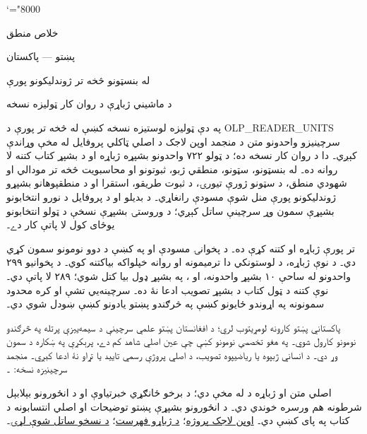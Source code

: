 \documentclass[11pt,a4paper,oneside]{report}
\theoremstyle{definition}
\begin{document}
\setRTL
\mathcode`\!="8000
\begin{titlepage}
\thispagestyle{empty}
\begin{center}
\vspace*{22mm}
{\Huge خلاص منطق}\par\bigskip
{\Large پښتو — پاکستان}\par\bigskip
{\LARGE له بنسټونو څخه تر ژوندليکونو پورې}\par\bigskip
د ماشيني ژباړې د روان کار ټوليزه نسخه
\end{center}
\bigskip
په دې ټوليزه لوستيزه نسخه کښې له  څخه تر
 پورې د OLP_READER_UNITS سرچينيزو واحدونو متن د
منجمد اوپن لاجک د اصلي ټاکلي پروفايل له مخې وړاندې کېږي۔ دا د روان کار
نسخه ده؛ د ټولو ۷۲۲ واحدونو بشپړه ژباړه او د بشپړ کتاب کتنه لا روانه ده۔
له بنسټونو، سټونو، منطقي ژبو، ثبوتونو او محاسبويت څخه تر مودالي او
شهودي منطق، د سټونو ژورې تيورۍ، د ثبوت طريقو، استقرا او د منطقپوهانو
بشپړو ژوندليکونو پورې منل شوې مسودې رانغاړي۔ د بديلو او د پروفايل
د نورو انتخابونو بشپړې سمون وړ سرچينې ساتل کېږي؛ د وروستۍ بشپړې نسخې
د ټولو انتخابونو يوځای کول لا پاتې کار دے۔

تر  پورې ژباړه او کتنه
 کړې ده۔
د  پخوانۍ مسودې او په
 کښې د دوو نومونو سمون
 کړي دي۔
د  نوې ژباړه، د لوستونکي دا ترميمونه
او روانه خپلواکه بياکتنه 
کوي۔ د پخوانيو ۲۹۹ واحدونو له ساحې ۱۰ بشپړ واحدونه،
 او ، په بشپړ
ډول بيا کتل شوي؛ ۲۸۹ لا پاتې دي۔ نوې کتنه د ټول کتاب د بشپړ
تصويب ادعا نۀ ده۔ سرچينه‌يي تشې او کره محدود سمونونه په اړوندو
ځايونو کښې په څرګندو پښتو يادونو کښې ښودل شوي دي۔

پاکستاني پښتو کارونه لومړيتوب لري؛ د افغانستان پښتو علمي سرچينې
د سيمه‌ييزې پرتله په څرګندو نومونو کارول شوي۔ په هغو تخصصي نومونو
کښې چې عين اصلي شاهد کم دے، پرېکړې په ښکاره د سمون وړ دي۔
د انساني ژبپوه يا رياضيپوه تصويب، د اصلي پروژې رسمي تاييد يا تړاو
نۀ ادعا کېږي۔ منجمد سرچينيزه نسخه:
۔

اصلي متن او ژباړه د \href{https://creativecommons.org/licenses/by/4.0/}{}
له مخې دي؛ د برخو ځانګړي خبرتياوې او د انځورونو بېلابېل شرطونه
هم ورسره خوندي دي۔ د انځورونو بشپړې پښتو توضيحات او اصلي
انتسابونه د کتاب په پای کښې دي۔
\href{https://openlogicproject.org/}{اوپن لاجک پروژه}؛
\href{https://github.com/KokunoYumeto/OpenLogic-translations}{د ژباړو فهرست}؛
\href{https://doi.org/10.5281/zenodo.22307197}{د نسخو ساتل شوې لړۍ}۔

\end{titlepage}
\tableofcontents
\clearpage
\end{document}
